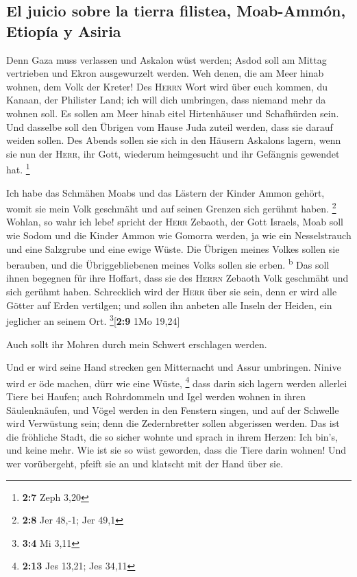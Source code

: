 \hypertarget{el-juicio-sobre-la-tierra-filistea-moab-ammuxf3n-etiopuxeda-y-asiria}{%
\subsection{El juicio sobre la tierra filistea, Moab-Ammón, Etiopía y
Asiria}\label{el-juicio-sobre-la-tierra-filistea-moab-ammuxf3n-etiopuxeda-y-asiria}}

 Denn Gaza muss verlassen und Askalon wüst werden; Asdod
soll am Mittag vertrieben und Ekron ausgewurzelt werden. 
Weh denen, die am Meer hinab wohnen, dem Volk der Kreter! Des
\textsc{Herrn} Wort wird über euch kommen, du Kanaan, der Philister
Land; ich will dich umbringen, dass niemand mehr da wohnen soll.
 Es sollen am Meer hinab eitel Hirtenhäuser und
Schafhürden sein.  Und dasselbe soll den Übrigen vom Hause
Juda zuteil werden, dass sie darauf weiden sollen. Des Abends sollen sie
sich in den Häusern Askalons lagern, wenn sie nun der \textsc{Herr}, ihr
Gott, wiederum heimgesucht und ihr Gefängnis gewendet hat. \footnote{\textbf{2:7}
  Zeph 3,20}

 Ich habe das Schmähen Moabs und das Lästern der Kinder
Ammon gehört, womit sie mein Volk geschmäht und auf seinen Grenzen sich
gerühmt haben. \footnote{\textbf{2:8} Jer 48,-1; Jer 49,1}
 Wohlan, so wahr ich lebe! spricht der \textsc{Herr}
Zebaoth, der Gott Israels, Moab soll wie Sodom und die Kinder Ammon wie
Gomorra werden, ja wie ein Nesselstrauch und eine Salzgrube und eine
ewige Wüste. Die Übrigen meines Volkes sollen sie berauben, und die
Übriggebliebenen meines Volks sollen sie erben. \textsuperscript{b}
 Das soll ihnen begegnen für ihre Hoffart, dass sie des
\textsc{Herrn} Zebaoth Volk geschmäht und sich gerühmt haben.
 Schrecklich wird der \textsc{Herr} über sie sein, denn
er wird alle Götter auf Erden vertilgen; und sollen ihn anbeten alle
Inseln der Heiden, ein jeglicher an seinem Ort.
\footnote{\textbf{3:4} Mi 3,11}{[}\textbf{2:9} 1Mo 19,24{]}

 Auch sollt ihr Mohren durch mein Schwert erschlagen
werden.

 Und er wird seine Hand strecken gen Mitternacht und
Assur umbringen. Ninive wird er öde machen, dürr wie eine Wüste,
\footnote{\textbf{2:13} Jes 13,21; Jes 34,11}  dass darin
sich lagern werden allerlei Tiere bei Haufen; auch Rohrdommeln und Igel
werden wohnen in ihren Säulenknäufen, und Vögel werden in den Fenstern
singen, und auf der Schwelle wird Verwüstung sein; denn die
Zedernbretter sollen abgerissen werden.  Das ist die
fröhliche Stadt, die so sicher wohnte und sprach in ihrem Herzen: Ich
bin's, und keine mehr. Wie ist sie so wüst geworden, dass die Tiere
darin wohnen! Und wer vorübergeht, pfeift sie an und klatscht mit der
Hand über sie.

